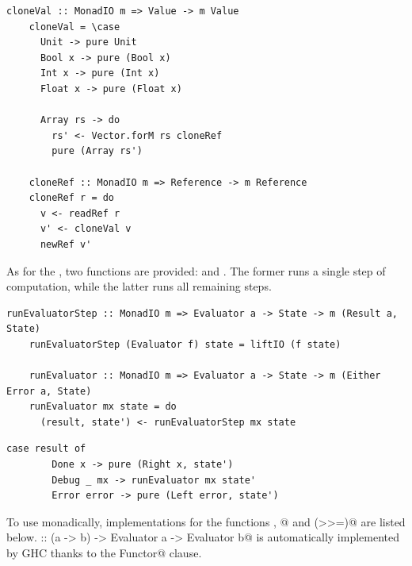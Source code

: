\documentclass[UdineBachThesis,american,11pt]{PhdThesis}
\begin{document}
  \begin{lstlisting}[gobble=4,basicstyle=\ttfamily\small]
    cloneVal :: MonadIO m => Value -> m Value
    cloneVal = \case
      Unit -> pure Unit
      Bool x -> pure (Bool x)
      Int x -> pure (Int x)
      Float x -> pure (Float x)

      Array rs -> do
        rs' <- Vector.forM rs cloneRef
        pure (Array rs')

    cloneRef :: MonadIO m => Reference -> m Reference
    cloneRef r = do
      v <- readRef r
      v' <- cloneVal v
      newRef v'
  \end{lstlisting}

  As for the \lstinline@Evaluator@, two functions are provided:
  \lstinline@runEvaluatorStep@ and \lstinline@runEvaluator@. The former runs a
  single step of computation, while the latter runs all remaining steps.

  \begin{lstlisting}[gobble=4,basicstyle=\ttfamily\small]
    runEvaluatorStep :: MonadIO m => Evaluator a -> State -> m (Result a, State)
    runEvaluatorStep (Evaluator f) state = liftIO (f state)

    runEvaluator :: MonadIO m => Evaluator a -> State -> m (Either Error a, State)
    runEvaluator mx state = do
      (result, state') <- runEvaluatorStep mx state
  \end{lstlisting}

  \newpage

  \begin{lstlisting}[gobble=4,basicstyle=\ttfamily\small]
      case result of
        Done x -> pure (Right x, state')
        Debug _ mx -> runEvaluator mx state'
        Error error -> pure (Left error, state')
  \end{lstlisting}

  To use \lstinline@Evaluator@s monadically, implementations for the functions
  \lstinline@pure@, @ and \lstinline@(>>=)@ are listed below.
  \lstinline@fmap :: (a -> b) -> Evaluator a -> Evaluator b@ is automatically
  implemented by GHC thanks to the \lstinline@deriving Functor@ clause.
\end{document}
